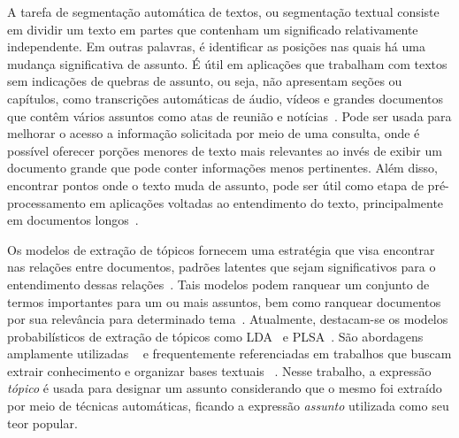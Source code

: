 





A tarefa de segmentação automática de textos, ou segmentação textual consiste em dividir um texto em partes que contenham um significado relativamente independente. Em outras palavras, é identificar as posições nas quais há uma mudança significativa de assunto. É útil em aplicações que trabalham com textos sem indicações de quebras de assunto, ou seja, não apresentam seções ou capítulos, como transcrições automáticas de áudio, vídeos e grandes documentos que contêm vários assuntos como atas de reunião e notícias~\cite{Aggarwal2018, bokaei2015, sakahara2014, misra2009, eisenstein2008, choi2000}.
Pode ser usada para melhorar o acesso a informação solicitada por meio de uma consulta, onde é possível oferecer porções menores de texto mais relevantes ao invés de exibir um documento grande que pode conter informações menos pertinentes.  Além disso, encontrar pontos onde o texto muda de assunto, pode ser útil como etapa de pré-processamento em aplicações voltadas ao entendimento do texto, principalmente em documentos longos~\cite{Choi2000}.




Os modelos de extração de tópicos fornecem uma estratégia que visa encontrar nas relações entre documentos, padrões latentes que sejam significativos para o entendimento dessas relações~\cite{Wei2007}. Tais modelos podem ranquear um conjunto de termos importantes para um ou mais assuntos, bem como ranquear documentos por sua relevância para determinado tema~\cite{Faleiros2016,Xing2009}.
Atualmente, destacam-se os modelos probabilísticos de extração de tópicos como LDA~\cite{Blei2003} e PLSA~\cite{Hofmann1999}. São abordagens amplamente utilizadas ~\cite{DZhu20122} e frequentemente referenciadas em trabalhos que buscam extrair conhecimento e organizar bases textuais ~\cite{Aggarwal2018, OCallaghan2015, Steyvers2007}.  
%
%
Nesse trabalho, a expressão \textit{tópico} é usada para designar um assunto considerando que o mesmo foi extraído por meio de técnicas automáticas, ficando a expressão \textit{assunto} utilizada como seu teor popular. 

